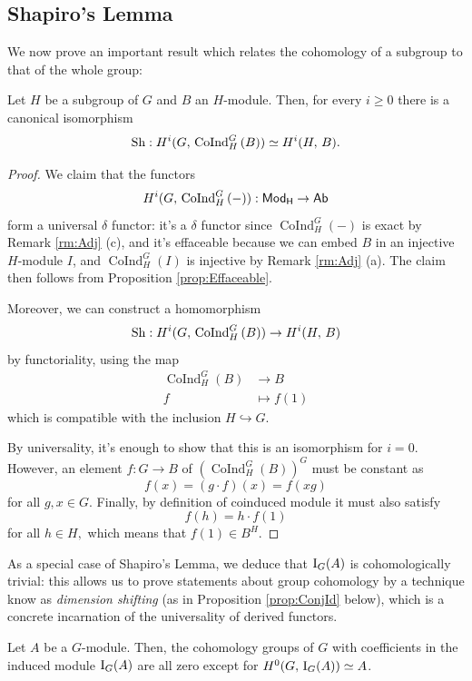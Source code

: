 \documentclass[a4paper, oneside]{memoir}
\begin{document}
\subsection{Shapiro's Lemma}
We now prove an important result which relates the cohomology of a subgroup to that of the whole group:
\begin{theorem}\label{thm:Shapiro}
	Let $H$ be a subgroup of $G$ and $B$ an $H$-module. Then, for every $i\geq0$ there is a canonical isomorphism
	\[
		\operatorname{Sh}: H^{i}( G, \, \operatorname{CoInd}^G_H{(B)} )\simeq H^{i}( H, \, B ).
	\]
\end{theorem}
\begin{proof}
	We claim that the functors
	\[
		H^{i}( G, \, \operatorname{CoInd}^G_H{(-)} ): \mathsf{Mod}_\mathsf{H}\to\mathsf{Ab}
	\]
	form a universal $\delta$ functor: it's a $\delta$ functor since $\operatorname{CoInd}^G_H{(-)}$ is exact by Remark \ref{rm:Adj} (c), and it's effaceable because we can embed $B$ in an injective $H$-module $I$, and $\operatorname{CoInd}^G_H{(I)}$ is injective by Remark \ref{rm:Adj} (a).
	The claim then follows from Proposition \ref{prop:Effaceable}.

	Moreover, we can construct a homomorphism
	\[
		\operatorname{Sh}: H^{i}( G, \, \operatorname{CoInd}^G_H{(B)} )\to H^{i}( H, \, B )
	\]
	by functoriality, using the map
	\begin{align*}
		\operatorname{CoInd}^G_H{(B)} & \to B        \\
		f                             & \mapsto f(1)
	\end{align*}
	which is compatible with the inclusion $H\hookrightarrow G$.

	By universality, it's enough to show that this is an isomorphism for $i=0$. However, an element $f:G\to B$ of $(\operatorname{CoInd}^G_H{(B)})^G$ must be constant as \[f(x)=(g\cdot f)(x)=f(xg)\] for all $g,x\in G$. Finally, by definition of coinduced module it must also satisfy \[f(h)=h\cdot f(1)\] for all $h\in H,$ which means that $f(1)\in B^H$.
\end{proof}

As a special case of Shapiro's Lemma, we deduce that $\operatorname{I}_{G}(A)$ is cohomologically trivial: this allows us to prove statements about group cohomology by a technique know as \textit{dimension
	shifting} (as in Proposition \ref{prop:ConjId} below), which is a concrete incarnation of the universality of derived functors.
\begin{corollary}\label{cor:IndMod}
	Let $A$ be a $G$-module. Then, the cohomology groups of $G$ with coefficients in the induced module $\operatorname{I}_{G}(A)$ are all zero except for $H^{0}( G, \, \operatorname{I}_{G}(A) )\simeq A$.
\end{corollary}
\end{document}
